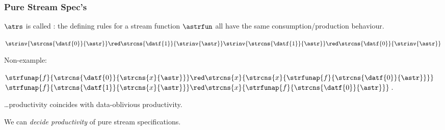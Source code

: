 \documentclass[10pt]{beamer}
\begin{document}
\begin{frame}%
  \frametitle{Pure Stream Spec's}

$\atrs$ is called :
  the defining rules for a stream function $\astrfun$
  all have the same consumption/production behaviour. 

\begin{example}
  \hspace*{1ex}
\parbox[t]{90pt}{
 $\strinv{\strcns{\datf{0}}{\astr}} \red \strcns{\datf{1}}{\strinv{\astr}} \\
  \strinv{\strcns{\datf{1}}{\astr}} \red \strcns{\datf{0}}{\strinv{\astr}}$}
%
\hspace*{15pt}
Non-example: 
\parbox[t]{110pt}{
$\strfunap{f}{ \strcns{\datf{0}}{\strcns{x}{\astr}} } 
 \red \strcns{x}{\strcns{x}{\strfunap{f}{\strcns{\datf{0}}{\astr}}}}$\\
$\strfunap{f}{\strcns{\datf{1}}{\strcns{x}{\astr}}}
 \red \strcns{x}{\strfunap{f}{\strcns{\datf{0}}{\astr}}} \; . $
}
\end{example}

\begin{proposition}
  \ldots productivity coincides with data-oblivious productivity.
\end{proposition}

\begin{theorem}
  We can \emph{decide productivity} of pure stream specifications.
\end{theorem}

\end{frame}%
\end{document}
